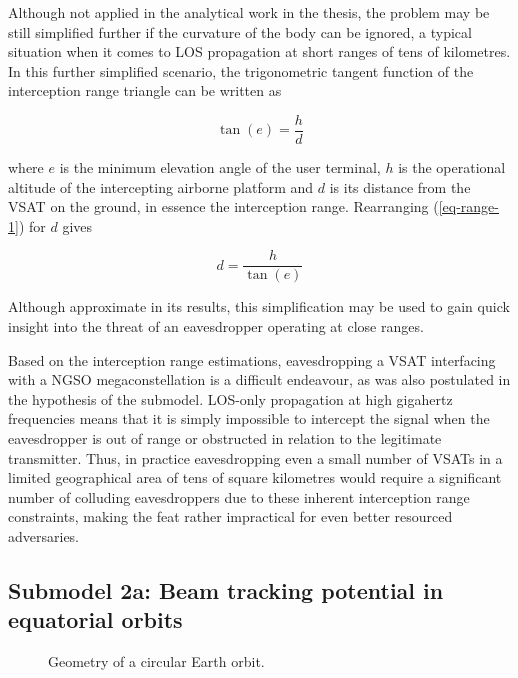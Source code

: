 \documentclass[english, 12pt, a4paper, elec, utf8, a-1b, online]{aaltothesis}
\begin{document}
Although not applied in the analytical work in the thesis, the problem may be still simplified further if the curvature of the body can be ignored, a typical situation when it comes to LOS propagation at short ranges of tens of kilometres.
In this further simplified scenario, the trigonometric tangent function of the interception range triangle can be written as

\begin{equation} \label{eq-range-1}
  \tan(e) = \frac{h}{d}
\end{equation}

\noindent
where $e$ is the minimum elevation angle of the user terminal, $h$ is the operational altitude of the intercepting airborne platform and $d$ is its distance from the VSAT on the ground, in essence the interception range.
Rearranging (\ref{eq-range-1}) for $d$ gives

\begin{equation} \label{eq-range-2}
  d = \frac{h}{\tan(e)}
\end{equation}

Although approximate in its results, this simplification may be used to gain quick insight into the threat of an eavesdropper operating at close ranges.

Based on the interception range estimations, eavesdropping a VSAT interfacing with a NGSO megaconstellation is a difficult endeavour, as was also postulated in the hypothesis of the submodel.
LOS-only propagation at high gigahertz frequencies means that it is simply impossible to intercept the signal when the eavesdropper is out of range or obstructed in relation to the legitimate transmitter.
Thus, in practice eavesdropping even a small number of VSATs in a limited geographical area of tens of square kilometres would require a significant number of colluding eavesdroppers due to these inherent interception range constraints, making the feat rather impractical for even better resourced adversaries.

\subsection{Submodel 2a: Beam tracking potential in equatorial orbits} \label{ch-results-submodel-2a-tracking-equatorial}

\begin{figure}[h]
  \centering
  
  \caption{Geometry of a circular Earth orbit.}
  \label{fig-orbit-geometry}
\end{figure}
\end{document}
